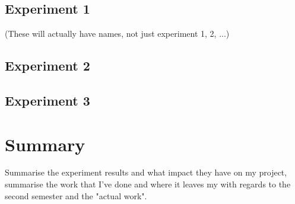 \documentclass{report}
\begin{document}
	\subsection{Experiment 1}
	(These will actually have names, not just experiment 1, 2, ...)
	\subsection{Experiment 2}
	\subsection{Experiment 3}
		
	\section{Summary}
	Summarise the experiment results and what impact they have on my project, summarise the work that I've done and where it leaves my with regards to the second semester and the "actual work". 
	
	
\end{document}
